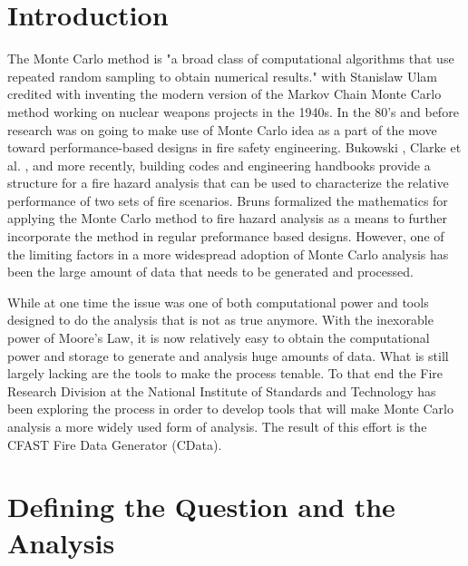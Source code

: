 \documentclass[12pt,twoside]{book}
\begin{document}
\cleardoublepage
\tableofcontents

\clearpage
\listoffigures


\mainmatter

%
%

\chapter{Introduction}

The Monte Carlo method is "a broad class of computational algorithms that use repeated random sampling to obtain numerical results." with Stanislaw Ulam credited with inventing the modern version of the Markov Chain Monte Carlo method working on nuclear weapons projects in the 1940s. In the 80’s and before research was on going to make use of Monte Carlo idea as a part of the move toward performance-based designs in fire safety engineering. Bukowski \cite{Bukowski_1985}, Clarke et al. \cite{Clarke_1990}, and more recently, building codes \cite{NFPA_5000} and engineering handbooks \cite{Hurley_2016} provide a structure for a fire hazard analysis that can be used to characterize the relative performance of two sets of fire scenarios. Bruns \cite{bruns_tn_2016} formalized the mathematics for applying the Monte Carlo method to fire hazard analysis as a means to further incorporate the method in regular preformance based designs. However, one of the limiting factors in a more widespread adoption of Monte Carlo analysis has been the large amount of data that needs to be generated and processed.

While at one time the issue was one of both computational power and tools designed to do the analysis that is not as true anymore. With the inexorable power of Moore’s Law, it is now relatively easy to obtain the computational power and storage to generate and analysis huge amounts of data. What is still largely lacking are the tools to make the process tenable. To that end the Fire Research Division at the National Institute of Standards and Technology has been exploring the process \cite{NIST_TN_2041,Reneke_2017,Reneke_2018,Cleary_2019} in order to develop tools that will make Monte Carlo analysis a more widely used form of analysis. The result of this effort is the CFAST Fire Data Generator (CData).

%
%

\chapter{Defining the Question and the Analysis}
\end{document}
